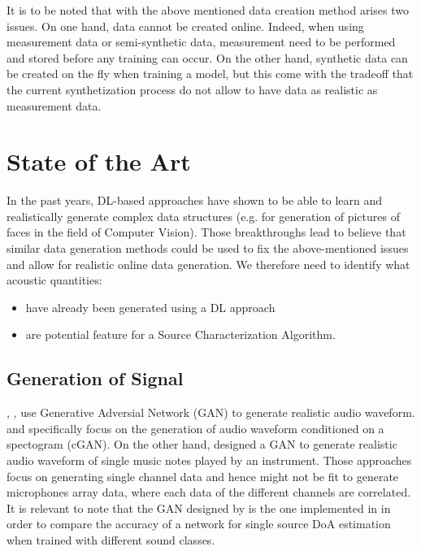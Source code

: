 \documentclass[11pt,a4paper,twoside]{report}
\begin{document}
It is to be noted that with the above mentioned data creation method arises two issues. On one hand, data cannot be created online. Indeed, when using measurement data or semi-synthetic data, measurement need to be performed and stored before any training can occur. On the other hand, synthetic data can be created on the fly when training a model, but this come with the tradeoff that the current synthetization process do not allow to have data as realistic as measurement data.

\section{State of the Art}

In the past years, DL-based approaches have shown to be able to learn and realistically generate complex data structures (e.g. \cite{karras2017progressive} for generation of pictures of faces in the field of Computer Vision). Those breakthroughs lead to believe that similar data generation methods could be used to fix the above-mentioned issues and allow for realistic online data generation. We therefore need to identify what acoustic quantities:
\begin{itemize}
    \item have already been generated using a DL approach
    \item are potential feature for a Source Characterization Algorithm.
\end{itemize}

\subsection{Generation of Signal}

\cite{neekhara2019expediting}, \cite{NEURIPS2019_6804c9bc}, \cite{engel2019gansynth} use Generative Adversial Network (GAN) to generate realistic audio waveform. \cite{neekhara2019expediting} and \cite{NEURIPS2019_6804c9bc} specifically focus on the generation of audio waveform conditioned on a spectogram (cGAN). On the other hand, \cite{engel2019gansynth} designed a GAN to generate realistic audio waveform of single music notes played by an instrument. Those approaches focus on generating single channel data and hence might not be fit to generate microphones array data, where each data of the different channels are correlated. It is relevant to note that the GAN designed by \cite{neekhara2019expediting} is the one implemented in \cite{vargas2021improved} in order to compare the accuracy of a network for single source DoA estimation when trained with different sound classes.
\end{document}
